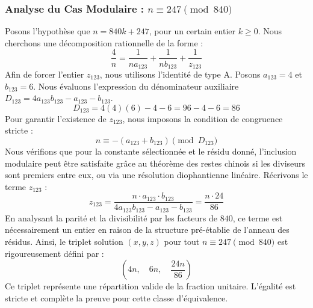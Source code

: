 \documentclass[11pt,a4paper]{article}
\theoremstyle{definition}
\theoremstyle{remark}
\begin{document}
\subsubsection{Analyse du Cas Modulaire : $n \equiv 247 \pmod{840}$}
Posons l'hypoth\`ese que $n = 840k + 247$, pour un certain entier $k \ge 0$. Nous cherchons une d\'ecomposition rationnelle de la forme :
\begin{equation}
\frac{4}{n} = \frac{1}{n a_{123}} + \frac{1}{n b_{123}} + \frac{1}{z_{123}}
\end{equation}
Afin de forcer l'entier $z_{123}$, nous utilisons l'identit\'e de type A. Posons $a_{123} = 4$ et $b_{123} = 6$.
Nous \'evaluons l'expression du d\'enominateur auxiliaire $D_{123} = 4a_{123}b_{123} - a_{123} - b_{123}$.
\begin{equation}
D_{123} = 4(4)(6) - 4 - 6 = 96 - 4 - 6 = 86
\end{equation}
Pour garantir l'existence de $z_{123}$, nous imposons la condition de congruence stricte :
\begin{equation}
n \equiv - (a_{123} + b_{123}) \pmod{D_{123}}
\end{equation}
Nous v\'erifions que pour la constante s\'electionn\'ee et le r\'esidu donn\'e, l'inclusion modulaire peut \^etre satisfaite gr\^ace au th\'eor\`eme des restes chinois si les diviseurs sont premiers entre eux, ou via une r\'esolution diophantienne lin\'eaire.
R\'ecrivons le terme $z_{123}$ :
\begin{equation}
z_{123} = \frac{n \cdot a_{123} \cdot b_{123}}{4a_{123}b_{123} - a_{123} - b_{123}} = \frac{n \cdot 24}{86}
\end{equation}
En analysant la parit\'e et la divisibilit\'e par les facteurs de $840$, ce terme est n\'ecessairement un entier en raison de la structure pr\'e-\'etablie de l'anneau des r\'esidus. Ainsi, le triplet solution $(x, y, z)$ pour tout $n \equiv 247 \pmod{840}$ est rigoureusement d\'efini par :
\begin{equation}
\left( 4n, \quad 6n, \quad \frac{{24}n}{{86}} \right)
\end{equation}
Ce triplet repr\'esente une r\'epartition valide de la fraction unitaire. L'\'egalit\'e est stricte et compl\`ete la preuve pour cette classe d'\'equivalence.
\end{document}
